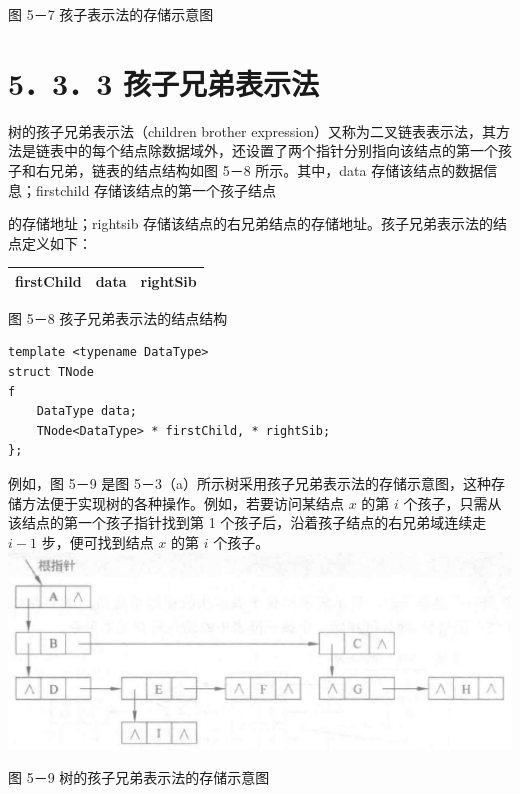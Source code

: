 \documentclass[10pt]{article}
\begin{document}
图 5－7 孩子表示法的存储示意图

\section*{5．3．3 孩子兄弟表示法}
树的孩子兄弟表示法（children brother expression）又称为二叉链表表示法，其方法是链表中的每个结点除数据域外，还设置了两个指针分别指向该结点的第一个孩子和右兄弟，链表的结点结构如图 5－8 所示。其中，data 存储该结点的数据信息；firstchild 存储该结点的第一个孩子结点

的存储地址；rightsib 存储该结点的右兄弟结点的存储地址。孩子兄弟表示法的结点定义如下：

\begin{center}
\begin{tabular}{|c|c|c|}
\hline
firstChild & data & rightSib \\
\hline
\end{tabular}
\end{center}

图 5－8 孩子兄弟表示法的结点结构

\begin{verbatim}
template <typename DataType>
struct TNode
f
    DataType data;
    TNode<DataType> * firstChild, * rightSib;
};
\end{verbatim}

例如，图 5－9 是图 5－3（a）所示树采用孩子兄弟表示法的存储示意图，这种存储方法便于实现树的各种操作。例如，若要访问某结点 $x$ 的第 $i$ 个孩子，只需从该结点的第一个孩子指针找到第 1 个孩子后，沿着孩子结点的右兄弟域连续走 $i-1$ 步，便可找到结点 $x$ 的第 $i$ 个孩子。\\
\includegraphics[max width=\textwidth, center]{2025_06_06_704745ea57b15b2333e5g-147(1)}

图 5－9 树的孩子兄弟表示法的存储示意图
\end{document}
